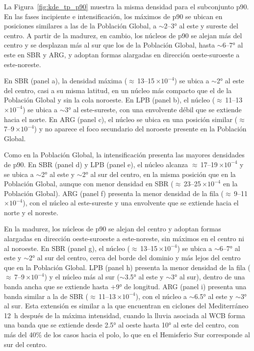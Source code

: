 La Figura~\ref{fig:kde_tp_p90} muestra la misma densidad para el subconjunto p90. En las fases incipiente e intensificación, los máximos de p90 se ubican en posiciones similares a las de la Población Global, a ${\sim}$2--3° al este y sureste del centro. A partir de la madurez, en cambio, los núcleos de p90 se alejan más del centro y se desplazan más al sur que los de la Población Global, hasta ${\sim}$6--7° al este en SBR y ARG, y adoptan formas alargadas en dirección oeste-suroeste a este-noreste.

En SBR (panel a), la densidad máxima (${\approx}$\,13--15\,$\times10^{-4}$) se ubica a ${\sim}$2° al este del centro, casi a su misma latitud, en un núcleo más compacto que el de la Población Global y sin la cola noroeste. En LPB (panel b), el núcleo (${\approx}$\,11--13\,$\times10^{-4}$) se ubica a ${\sim}$3° al este-sureste, con una envolvente débil que se extiende hacia el norte. En ARG (panel c), el núcleo se ubica en una posición similar (${\approx}$\,7--9\,$\times10^{-4}$) y no aparece el foco secundario del noroeste presente en la Población Global.

Como en la Población Global, la intensificación presenta las mayores densidades de p90. En SBR (panel d) y LPB (panel e), el núcleo alcanza ${\approx}$\,17--19\,$\times10^{-4}$ y se ubica a ${\sim}$2° al este y ${\sim}$2° al sur del centro, en la misma posición que en la Población Global, aunque con menor densidad en SBR (${\approx}$\,23--25\,$\times10^{-4}$ en la Población Global). ARG (panel f) presenta la menor densidad de la fila (${\approx}$\,9--11\,$\times10^{-4}$), con el núcleo al este-sureste y una envolvente que se extiende hacia el norte y el noreste.

En la madurez, los núcleos de p90 se alejan del centro y adoptan formas alargadas en dirección oeste-suroeste a este-noreste, sin máximos en el centro ni al noroeste. En SBR (panel g), el núcleo (${\approx}$\,13--15\,$\times10^{-4}$) se ubica a ${\sim}$6--7° al este y ${\sim}$2° al sur del centro, cerca del borde del dominio y más lejos del centro que en la Población Global. LPB (panel h) presenta la menor densidad de la fila (${\approx}$\,7--9\,$\times10^{-4}$) y el núcleo más al sur (${\sim}$3.5° al este y ${\sim}$3° al sur), dentro de una banda ancha que se extiende hasta $+$9° de longitud. ARG (panel i) presenta una banda similar a la de SBR (${\approx}$\,11--13\,$\times10^{-4}$), con el núcleo a ${\sim}$6.5° al este y ${\sim}$3° al sur. Esta extensión es similar a la que \citet{flaounas2018heavy} encuentran en ciclones del Mediterráneo 12~h después de la máxima intensidad, cuando la lluvia asociada al WCB forma una banda que se extiende desde 2.5° al oeste hasta 10° al este del centro, con más del 40\% de los casos hacia el polo, lo que en el Hemisferio Sur corresponde al sur del centro.

